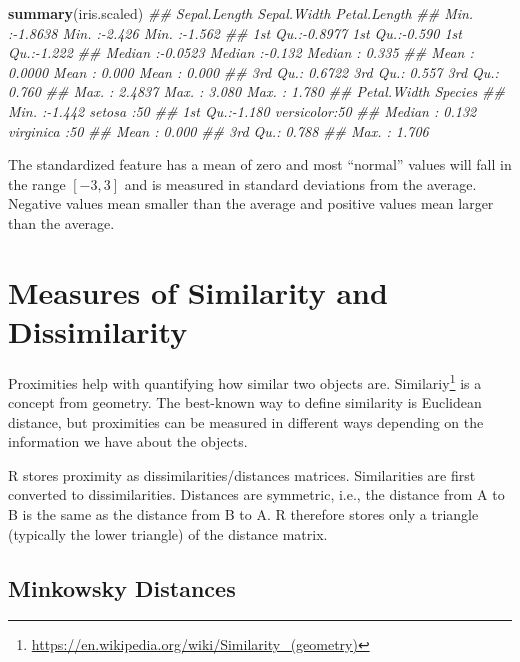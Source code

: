 \documentclass[
  notitlepage]{book}
\newenvironment{Shaded}{\begin{snugshade}}{\end{snugshade}}
\newcommand{\CommentTok}[1]{\textcolor[rgb]{0.56,0.35,0.01}{\textit{#1}}}
\newcommand{\KeywordTok}[1]{\textcolor[rgb]{0.13,0.29,0.53}{\textbf{#1}}}
\newcommand{\NormalTok}[1]{#1}
\DeclareRobustCommand{\href}[2]{#2\footnote{\url{#1}}}
\begin{document}
\begin{Shaded}
\begin{Highlighting}[]
\KeywordTok{summary}\NormalTok{(iris.scaled)}
\CommentTok{\#\#   Sepal.Length      Sepal.Width      Petal.Length   }
\CommentTok{\#\#  Min.   :{-}1.8638   Min.   :{-}2.426   Min.   :{-}1.562  }
\CommentTok{\#\#  1st Qu.:{-}0.8977   1st Qu.:{-}0.590   1st Qu.:{-}1.222  }
\CommentTok{\#\#  Median :{-}0.0523   Median :{-}0.132   Median : 0.335  }
\CommentTok{\#\#  Mean   : 0.0000   Mean   : 0.000   Mean   : 0.000  }
\CommentTok{\#\#  3rd Qu.: 0.6722   3rd Qu.: 0.557   3rd Qu.: 0.760  }
\CommentTok{\#\#  Max.   : 2.4837   Max.   : 3.080   Max.   : 1.780  }
\CommentTok{\#\#   Petal.Width           Species  }
\CommentTok{\#\#  Min.   :{-}1.442   setosa    :50  }
\CommentTok{\#\#  1st Qu.:{-}1.180   versicolor:50  }
\CommentTok{\#\#  Median : 0.132   virginica :50  }
\CommentTok{\#\#  Mean   : 0.000                  }
\CommentTok{\#\#  3rd Qu.: 0.788                  }
\CommentTok{\#\#  Max.   : 1.706}
\end{Highlighting}
\end{Shaded}

The standardized feature has a mean of zero and most ``normal'' values
will fall in the range \([-3,3]\) and is measured in standard deviations from the average.
Negative values mean smaller than the average and positive values mean larger than the average.

\hypertarget{measures-of-similarity-and-dissimilarity}{%
\section{Measures of Similarity and Dissimilarity}\label{measures-of-similarity-and-dissimilarity}}

Proximities help with quantifying how similar two objects are.
\href{https://en.wikipedia.org/wiki/Similarity_(geometry)}{Similariy} is a concept from geometry.
The best-known
way to define similarity is Euclidean distance, but proximities can be measured in
different ways depending on the information we have about the objects.

R stores proximity as dissimilarities/distances matrices. Similarities
are first converted to dissimilarities. Distances are symmetric, i.e.,
the distance from A to B is the same as the distance from B to A. R
therefore stores only a triangle (typically the lower triangle) of the
distance matrix.

\hypertarget{minkowsky-distances}{%
\subsection{Minkowsky Distances}\label{minkowsky-distances}}
\end{document}
